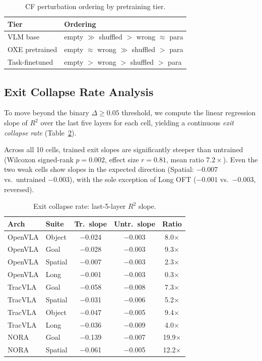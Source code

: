 \documentclass[10pt,twocolumn]{article}
\begin{document}
\begin{table}[t]
\centering
\caption{CF perturbation ordering by pretraining tier.}
\label{tab:cf_ordering}
\small
\begin{tabular}{@{}ll@{}}
\toprule
\textbf{Tier} & \textbf{Ordering} \\
\midrule
VLM base & empty $\gg$ shuffled $>$ wrong $\approx$ para \\
OXE pretrained & empty $\approx$ wrong $\gg$ shuffled $>$ para \\
Task-finetuned & empty $>$ wrong $>$ shuffled $>$ para \\
\bottomrule
\end{tabular}
\end{table}

\subsection{Exit Collapse Rate Analysis}
\label{sec:exitrate}

To move beyond the binary $\Delta \geq 0.05$ threshold, we compute the linear regression slope of $R^2$ over the last five layers for each cell, yielding a continuous \emph{exit collapse rate} (Table~\ref{tab:exit_slope}).

Across all 10 cells, trained exit slopes are significantly steeper than untrained (Wilcoxon signed-rank $p = 0.002$, effect size $r = 0.81$, mean ratio $7.2\times$). Even the two weak cells show slopes in the expected direction (Spatial: $-0.007$ vs.\ untrained $-0.003$), with the sole exception of Long OFT ($-0.001$ vs.\ $-0.003$, reversed).

\begin{table}[t]
\centering
\caption{Exit collapse rate: last-5-layer $R^2$ slope.}
\label{tab:exit_slope}
\small
\begin{tabular}{@{}llccc@{}}
\toprule
\textbf{Arch} & \textbf{Suite} & \textbf{Tr.\ slope} & \textbf{Untr.\ slope} & \textbf{Ratio} \\
\midrule
OpenVLA & Object & $-$0.024 & $-$0.003 & 8.0$\times$ \\
OpenVLA & Goal & $-$0.028 & $-$0.003 & 9.3$\times$ \\
OpenVLA & Spatial & $-$0.007 & $-$0.003 & 2.3$\times$ \\
OpenVLA & Long & $-$0.001 & $-$0.003 & 0.3$\times$ \\
TracVLA & Goal & $-$0.058 & $-$0.008 & 7.3$\times$ \\
TracVLA & Spatial & $-$0.031 & $-$0.006 & 5.2$\times$ \\
TracVLA & Object & $-$0.047 & $-$0.005 & 9.4$\times$ \\
TracVLA & Long & $-$0.036 & $-$0.009 & 4.0$\times$ \\
NORA & Goal & $-$0.139 & $-$0.007 & 19.9$\times$ \\
NORA & Spatial & $-$0.061 & $-$0.005 & 12.2$\times$ \\
\bottomrule
\end{tabular}
\end{table}
\end{document}
